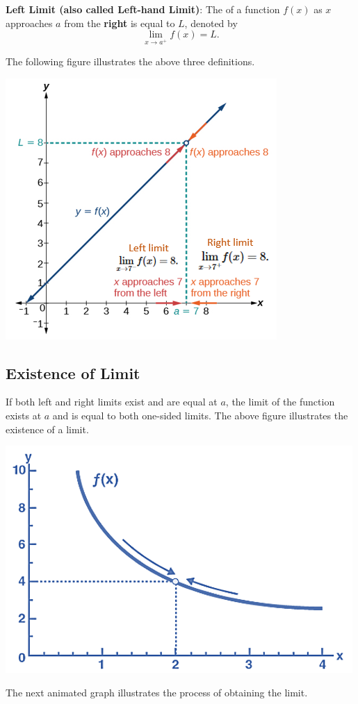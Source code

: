 \documentclass[
]{book}
\begin{document}
\textbf{Left Limit (also called Left-hand Limit)}: The of a function \(f(x)\) as \(x\) approaches \(a\) from the \textbf{right} is equal to \(L\), denoted by \[
\lim_{x \to a^+} f(x) = L.
\]

The following figure illustrates the above three definitions.

\begin{center}\includegraphics[width=0.55\linewidth]{img01/w01note11-LeftRightLimits} \end{center}

\hypertarget{existence-of-limit}{%
\subsection{Existence of Limit}\label{existence-of-limit}}

If both left and right limits exist and are equal at \(a\), the limit of the function exists at \(a\) and is equal to both one-sided limits. The above figure illustrates the existence of a limit.

\begin{center}\includegraphics[width=0.55\linewidth]{img01/w01note13-ExistenceLimits} \end{center}

The next animated graph illustrates the process of obtaining the limit.

\hfill\break
\end{document}
